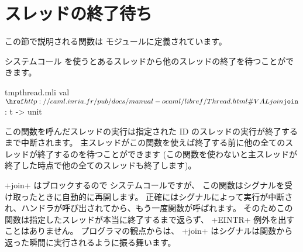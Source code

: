 \section{スレッドの終了待ち}

この節で説明される関数は  モジュールに定義されています。

システムコール  を使うとあるスレッドから他のスレッドの終了を待つことができます。
%
\begin{listingcodefile}{tmpthread.mli}
val $\libvalue{Thread}{join}$ : t -> unit
\end{listingcodefile}
%
この関数を呼んだスレッドの実行は指定された ID のスレッドの実行が終了するまで中断されます。
主スレッドがこの関数を使えば終了する前に他の全てのスレッドが終了するのを待つことができます
(この関数を使わないと主スレッドが終了した時点で他の全てのスレッドも終了します)。

\ml+join+ はブロックするので  システムコールですが、
この関数はシグナルを受け取ったときに自動的に再開します。
正確にはシグナルによって実行が中断され、ハンドラが呼び出されてから、もう一度関数が呼ばれます。
そのためこの関数は指定したスレッドが本当に終了するまで返らず、
\ml+EINTR+ 例外を出すことはありません。
\ocaml プログラマの観点からは、
\ml+join+ はシグナルは関数から返った瞬間に実行されるように振る舞います。

